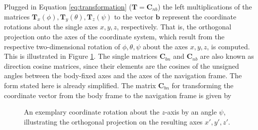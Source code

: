 \noindent
Plugged in Equation \ref{eq:transformation} ($\mathbf{T} = \mathbf{C}_{nb}$) the left multiplications of the matrices $\mathbf{T}_x(\phi), \mathbf{T}_y(\theta), \mathbf{T}_z(\psi)$ to the vector $\mathbf{b}$ represent the coordinate rotations about the single axes $x, y, z$, respectively. That is, the orthogonal projection onto the axes of the coordinate system, which result from the respective two-dimensional rotation of $\phi, \theta, \psi$ about the axes $x, y, z$, is computed. This is illustrated in Figure \ref{fig:transformation_matrix}. The single matrices $\mathbf{C}_{bn}$ and $\mathbf{C}_{nb}$ are also known as direction cosine matrices, since their elements are the cosines of the unsigned angles between the body-fixed axes and the axes of the navigation frame. The form stated here is already simplified. The matrix $\mathbf{C}_{bn}$ for transforming the coordinate vector from the body frame to the navigation frame is given by

\begin{figure}
\centering


\caption{An exemplary coordinate rotation about the $z$-axis by an angle $\psi$, illustrating the orthogonal projection on the resulting axes $x', y', z'$.}
	\label{fig:transformation_matrix}
\end{figure}


